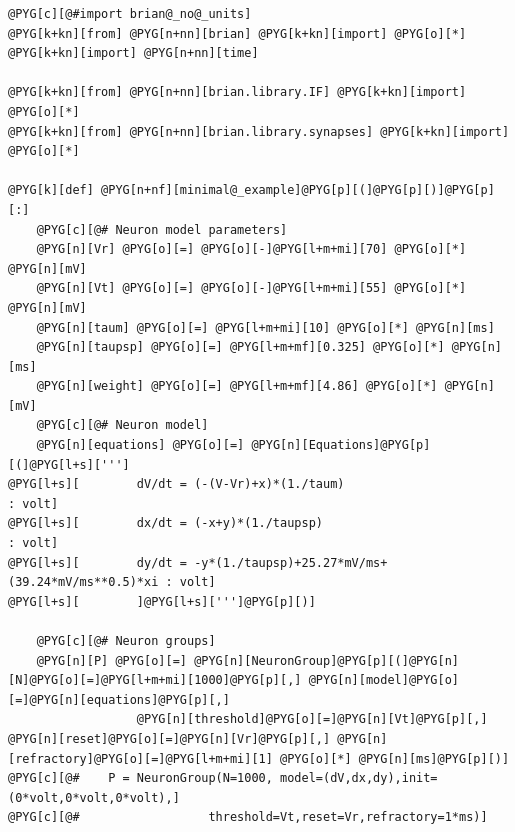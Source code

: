 \documentclass[letterpaper,10pt,english]{manual}
\begin{document}
\begin{Verbatim}[commandchars=@\[\]]
@PYG[c][@#import brian@_no@_units]
@PYG[k+kn][from] @PYG[n+nn][brian] @PYG[k+kn][import] @PYG[o][*]
@PYG[k+kn][import] @PYG[n+nn][time]

@PYG[k+kn][from] @PYG[n+nn][brian.library.IF] @PYG[k+kn][import] @PYG[o][*]
@PYG[k+kn][from] @PYG[n+nn][brian.library.synapses] @PYG[k+kn][import] @PYG[o][*]

@PYG[k][def] @PYG[n+nf][minimal@_example]@PYG[p][(]@PYG[p][)]@PYG[p][:]
    @PYG[c][@# Neuron model parameters]
    @PYG[n][Vr] @PYG[o][=] @PYG[o][-]@PYG[l+m+mi][70] @PYG[o][*] @PYG[n][mV]
    @PYG[n][Vt] @PYG[o][=] @PYG[o][-]@PYG[l+m+mi][55] @PYG[o][*] @PYG[n][mV]
    @PYG[n][taum] @PYG[o][=] @PYG[l+m+mi][10] @PYG[o][*] @PYG[n][ms]
    @PYG[n][taupsp] @PYG[o][=] @PYG[l+m+mf][0.325] @PYG[o][*] @PYG[n][ms]
    @PYG[n][weight] @PYG[o][=] @PYG[l+m+mf][4.86] @PYG[o][*] @PYG[n][mV]
    @PYG[c][@# Neuron model]
    @PYG[n][equations] @PYG[o][=] @PYG[n][Equations]@PYG[p][(]@PYG[l+s][''']
@PYG[l+s][        dV/dt = (-(V-Vr)+x)*(1./taum)                            : volt]
@PYG[l+s][        dx/dt = (-x+y)*(1./taupsp)                               : volt]
@PYG[l+s][        dy/dt = -y*(1./taupsp)+25.27*mV/ms+(39.24*mV/ms**0.5)*xi : volt]
@PYG[l+s][        ]@PYG[l+s][''']@PYG[p][)]

    @PYG[c][@# Neuron groups]
    @PYG[n][P] @PYG[o][=] @PYG[n][NeuronGroup]@PYG[p][(]@PYG[n][N]@PYG[o][=]@PYG[l+m+mi][1000]@PYG[p][,] @PYG[n][model]@PYG[o][=]@PYG[n][equations]@PYG[p][,]
                  @PYG[n][threshold]@PYG[o][=]@PYG[n][Vt]@PYG[p][,] @PYG[n][reset]@PYG[o][=]@PYG[n][Vr]@PYG[p][,] @PYG[n][refractory]@PYG[o][=]@PYG[l+m+mi][1] @PYG[o][*] @PYG[n][ms]@PYG[p][)]
@PYG[c][@#    P = NeuronGroup(N=1000, model=(dV,dx,dy),init=(0*volt,0*volt,0*volt),]
@PYG[c][@#                  threshold=Vt,reset=Vr,refractory=1*ms)]


\end{Verbatim}
\end{document}
